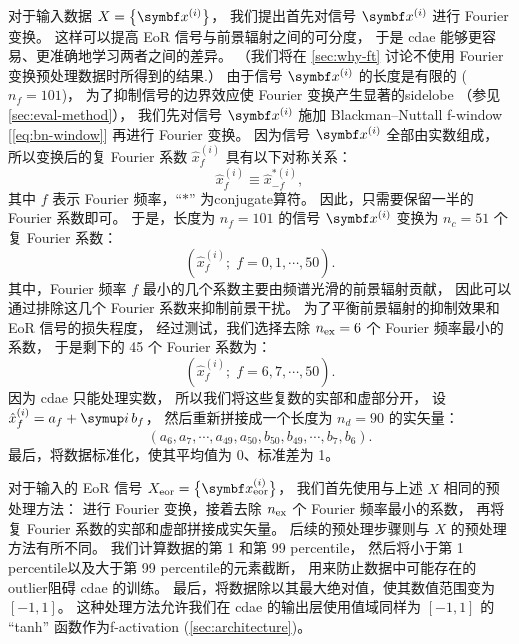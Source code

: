 对于输入数据 $X = \big\{ \B{x}^{(i)} \big\}$，
我们提出首先对信号 $\B{x}^{(i)}$ 进行 Fourier 变换。
这样可以提高 EoR 信号与前景辐射之间的可分度，
于是 \ac{cdae} 能够更容易、更准确地学习两者之间的差异。
（我们将在 \autoref{sec:why-ft} 讨论不使用 Fourier 变换预处理数据时所得到的结果.）
由于信号 $\B{x}^{(i)}$ 的长度是有限的 ($n_f = 101$)，
为了抑制信号的边界效应使 Fourier 变换产生显著的\ac{sidelobe}
（参见 \autoref{sec:eval-method}），
我们先对信号 $\B{x}^{(i)}$ 施加 Blackman--Nuttall \ac{f-window}
\cite{chapman2016} [\autoref{eq:bn-window}]
再进行 Fourier 变换。
因为信号 $\B{x}^{(i)}$ 全部由实数组成，
所以变换后的复 Fourier 系数 $\hat{x}^{(i)}_{f}$ 具有以下对称关系：
\begin{equation}
  \hat{x}^{(i)}_{f} \equiv \hat{x}^{*(i)}_{-f} ,
\end{equation}
其中 $f$ 表示 Fourier 频率，\enquote{$*$} 为\ac{conjugate}算符。
因此，只需要保留一半的 Fourier 系数即可。
于是，长度为 $n_f = 101$ 的信号 $\B{x}^{(i)}$ 变换为
$n_c = 51$ 个复 Fourier 系数：
\begin{equation}
  \left( \hat{x}^{(i)}_f; \; f = 0, 1, \cdots, 50 \right) .
\end{equation}
其中，Fourier 频率 $f$ 最小的几个系数主要由频谱光滑的前景辐射贡献，
因此可以通过排除这几个 Fourier 系数来抑制前景干扰。
为了平衡前景辐射的抑制效果和 EoR 信号的损失程度，
经过测试，我们选择去除 $n_{\mathrm{ex}} = 6$ 个 Fourier 频率最小的系数，
于是剩下的 45 个 Fourier 系数为：
\begin{equation}
  \left( \hat{x}^{(i)}_f; \; f = 6, 7, \cdots, 50 \right) .
\end{equation}
因为 \ac{cdae} 只能处理实数，
所以我们将这些复数的实部和虚部分开，
设 $\hat{x}^{(i)}_f = a_f + \Ci\,b_f$，
然后重新拼接成一个长度为 $n_d = 90$ 的实矢量：
\begin{equation}
  (a_6, a_7, \cdots, a_{49}, a_{50},
   b_{50}, b_{49}, \cdots, b_7, b_6) .
\end{equation}
最后，将数据标准化，使其平均值为 0、标准差为 1。

对于输入的 EoR 信号 $X_{\R{eor}} = \big\{ \B{x}^{(i)}_{\R{eor}} \big\}$，
我们首先使用与上述 $X$ 相同的预处理方法：
进行 Fourier 变换，接着去除 $n_{\mathrm{ex}}$ 个 Fourier 频率最小的系数，
再将复 Fourier 系数的实部和虚部拼接成实矢量。
后续的预处理步骤则与 $X$ 的预处理方法有所不同。
我们计算数据的第 1 和第 99 \ac{percentile}，
然后将小于第 1 \ac{percentile}以及大于第 99 \ac{percentile}的元素截断，
用来防止数据中可能存在的\ac{outlier}阻碍 \ac{cdae} 的训练。
最后，将数据除以其最大绝对值，使其数值范围变为 $[-1, 1]$。
这种处理方法允许我们在 \ac{cdae} 的输出层使用值域同样为 $[-1, 1]$
的 \enquote{tanh} 函数作为\ac{f-activation} (\autoref{sec:architecture})。


